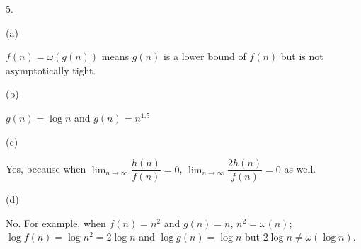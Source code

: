 \documentclass[UTF8,12pt,letterpaper,oneside]{amsart}
\begin{document}
5.

(a)

$f(n) = \omega(g(n))$ means $g(n)$ is a lower bound of $f(n)$ but is not asymptotically tight.

(b)

$g(n) = \log n$ and $g(n) = n^{1.5}$

(c)

Yes, because when $\lim_{n \to \infty} \dfrac{h(n)}{f(n)} = 0$, $\lim_{n \to \infty} \dfrac{2h(n)}{f(n)} = 0$ as well.

(d)

No. For example, when $f(n) = n^2$ and $g(n) = n$, $n^2 = \omega(n)$; $\log f(n) = \log n^2 = 2 \log n$ and $\log g(n) = \log n$ but $2 \log n \neq \omega(\log n)$.
\end{document}
